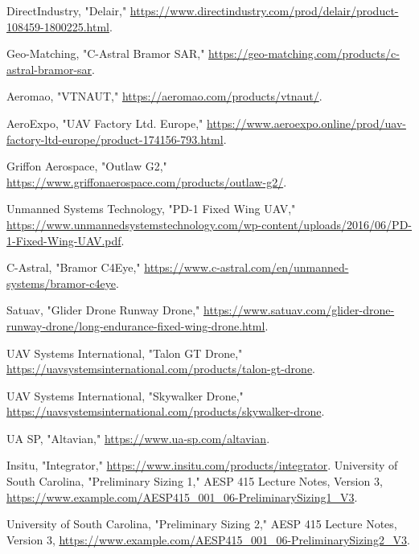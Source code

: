\documentclass[12pt]{report}
\begin{document}
\begin{thebibliography}{99}
				DirectIndustry, "Delair," \url{https://www.directindustry.com/prod/delair/product-108459-1800225.html}.
				
				Geo-Matching, "C-Astral Bramor SAR," \url{https://geo-matching.com/products/c-astral-bramor-sar}.
				
				Aeromao, "VTNAUT," \url{https://aeromao.com/products/vtnaut/}.
				
				AeroExpo, "UAV Factory Ltd. Europe," \url{https://www.aeroexpo.online/prod/uav-factory-ltd-europe/product-174156-793.html}.
				
				Griffon Aerospace, "Outlaw G2," \url{https://www.griffonaerospace.com/products/outlaw-g2/}.
				
				Unmanned Systems Technology, "PD-1 Fixed Wing UAV," \url{https://www.unmannedsystemstechnology.com/wp-content/uploads/2016/06/PD-1-Fixed-Wing-UAV.pdf}.
				
				C-Astral, "Bramor C4Eye," \url{https://www.c-astral.com/en/unmanned-systems/bramor-c4eye}.
				
				Satuav, "Glider Drone Runway Drone," \url{https://www.satuav.com/glider-drone-runway-drone/long-endurance-fixed-wing-drone.html}.
				
				UAV Systems International, "Talon GT Drone," \url{https://uavsystemsinternational.com/products/talon-gt-drone}.
				
				UAV Systems International, "Skywalker Drone," \url{https://uavsystemsinternational.com/products/skywalker-drone}.
				
				UA SP, "Altavian," \url{https://www.ua-sp.com/altavian}.
				
				Insitu, "Integrator," \url{https://www.insitu.com/products/integrator}.
				University of South Carolina, "Preliminary Sizing 1," AESP 415 Lecture Notes, Version 3, \url{https://www.example.com/AESP415_001_06-PreliminarySizing1_V3}.
				
				University of South Carolina, "Preliminary Sizing 2," AESP 415 Lecture Notes, Version 3, \url{https://www.example.com/AESP415_001_06-PreliminarySizing2_V3}.
				
				
				
							
			
		\end{thebibliography}
		
\end{document}
